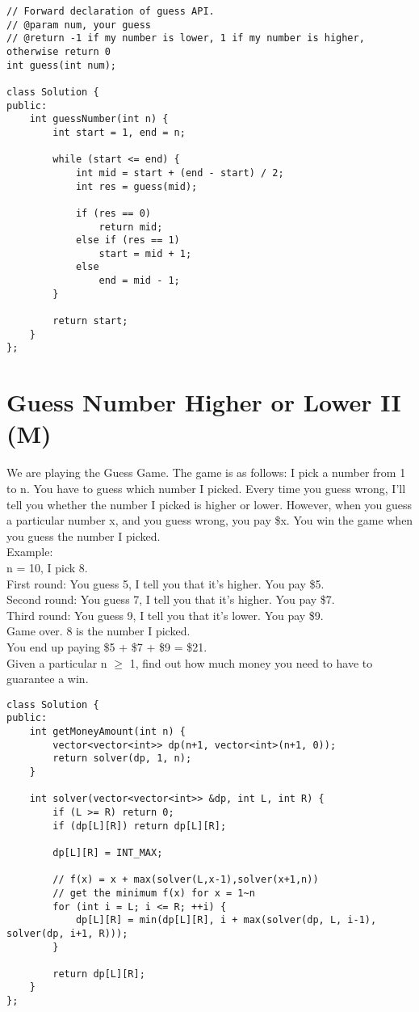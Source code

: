 \begin{lstlisting}
// Forward declaration of guess API.
// @param num, your guess
// @return -1 if my number is lower, 1 if my number is higher, otherwise return 0
int guess(int num);

class Solution {
public:
    int guessNumber(int n) {
        int start = 1, end = n;
        
        while (start <= end) {
            int mid = start + (end - start) / 2;
            int res = guess(mid);
            
            if (res == 0)   
                return mid;
            else if (res == 1)  
                start = mid + 1;
            else
                end = mid - 1;
        }
        
        return start;
    }
};
\end{lstlisting}


\section{Guess Number Higher or Lower II (M)}
We are playing the Guess Game. The game is as follows: I pick a number from 1 to n. You have to guess which number I picked. Every time you guess wrong, I'll tell you whether the number I picked is higher or lower. However, when you guess a particular number x, and you guess wrong, you pay \$x. You win the game when you guess the number I picked. \\

Example:\\
n = 10, I pick 8.\\
First round:  You guess 5, I tell you that it's higher. You pay \$5. \\
Second round: You guess 7, I tell you that it's higher. You pay \$7.\\
Third round:  You guess 9, I tell you that it's lower. You pay \$9.\\
Game over. 8 is the number I picked.\\
You end up paying \$5 + \$7 + \$9 = \$21.\\

Given a particular n $\geq$ 1, find out how much money you need to have to guarantee a win.\\

\begin{lstlisting}
class Solution {
public:
    int getMoneyAmount(int n) {
        vector<vector<int>> dp(n+1, vector<int>(n+1, 0));
        return solver(dp, 1, n);
    }
    
    int solver(vector<vector<int>> &dp, int L, int R) {
        if (L >= R) return 0;
        if (dp[L][R]) return dp[L][R];
        
        dp[L][R] = INT_MAX;
        
        // f(x) = x + max(solver(L,x-1),solver(x+1,n))
        // get the minimum f(x) for x = 1~n
        for (int i = L; i <= R; ++i) {
            dp[L][R] = min(dp[L][R], i + max(solver(dp, L, i-1), solver(dp, i+1, R)));
        }
        
        return dp[L][R];
    }
};
\end{lstlisting}


